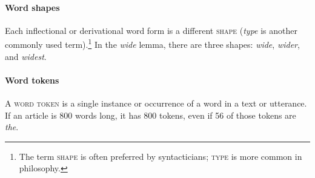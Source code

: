 \paragraph*{Word shapes} Each inflectional or derivational word form is a different \textsc{shape} (\textit{type} is another commonly used term).\footnote{The term \textsc{shape} is often preferred by syntacticians; \textsc{type} is more common in philosophy.} In the \textit{wide} lemma, there are three shapes: \textit{wide}, \textit{wider}, and \textit{widest}.

\paragraph*{Word tokens} A \textsc{word token} is a single instance or occurrence of a word in a text or utterance. If an article is 800 words long, it has 800 tokens, even if 56 of those tokens are \textit{the}.

